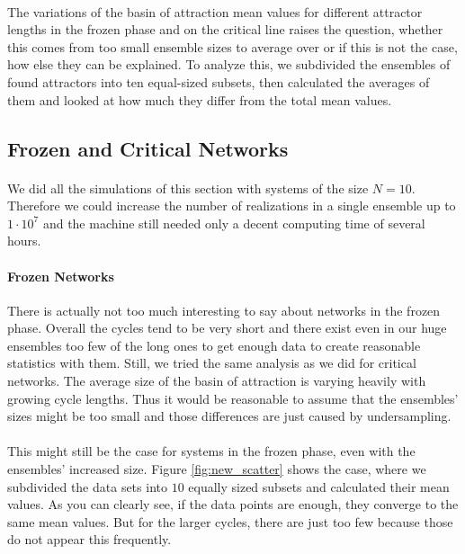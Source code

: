 \paragraph*{}
The variations of the basin of attraction mean values for different attractor lengths in the frozen phase and on the critical line raises the question, whether this comes from too small ensemble sizes to average over or if this is not the case, how else they can be explained. To analyze this, we subdivided the ensembles of found attractors into ten equal-sized subsets, then calculated the averages of them and looked at how much they differ from the total mean values.

\subsection{Frozen and Critical Networks}
\paragraph*{}
We did all the simulations of this section with systems of the size $N=10$. Therefore we could increase the number of realizations in a single ensemble up to $1\cdot 10^7$ and the machine still needed only a decent computing time of several hours.

\paragraph*{Frozen Networks}
There is actually not too much interesting to say about networks in the frozen phase. Overall the cycles tend to be very short and there exist even in our huge ensembles too few of the long ones to get enough data to create reasonable statistics with them. Still, we tried the same analysis as we did for critical networks. The average size of the basin of attraction is varying heavily with growing cycle lengths. Thus it would be reasonable to assume that the ensembles' sizes might be too small and those differences are just caused by undersampling.

\paragraph*{}
This might still be the case for systems in the frozen phase, even with the ensembles' increased size. Figure \ref{fig:new_scatter} shows the case, where we subdivided the data sets into $10$ equally sized subsets and calculated their mean values. As you can clearly see, if the data points are enough, they converge to the same mean values. But for the larger cycles, there are just too few because those do not appear this frequently.

